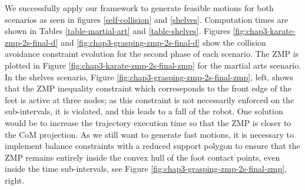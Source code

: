 We successfully apply our framework to generate feasible motions for
both scenarios as seen in figures \ref{self-collision} and
\ref{shelves}. Computation times are shown in Tables
\ref{table-martial-art} and \ref{table-shelves}. Figures
\ref{fig:chap3-karate-zmp-2s-final-d} and
\ref{fig:chap3-grasping-zmp-2s-final-d} show the collision avoidance
constraint evolution for the second phase of each scenario. The ZMP is
plotted in Figure \ref{fig:chap3-karate-zmp-2s-final-zmp} for the
martial arts scenario. In the shelves scenario, Figure
\ref{fig:chap3-grasping-zmp-2s-final-zmp}, left, shows that the ZMP
inequality constraint which correseponds to the front edge of the feet
is active at three nodes; as this constraint is not necessarily
enforced on the sub-intervals, it is violated, and this leads to a
fall of the robot. One solution would be to increase the trajectory
execution time so that the ZMP is closer to the CoM projection. As we
still want to generate fast motions, it is necessary to implement
balance constraints with a reduced support polygon to ensure that the
ZMP remains entirely inside the convex hull of the foot contact
points, even inside the time sub-intervals, see Figure
\ref{fig:chap3-grasping-zmp-2s-final-zmp}, right.

